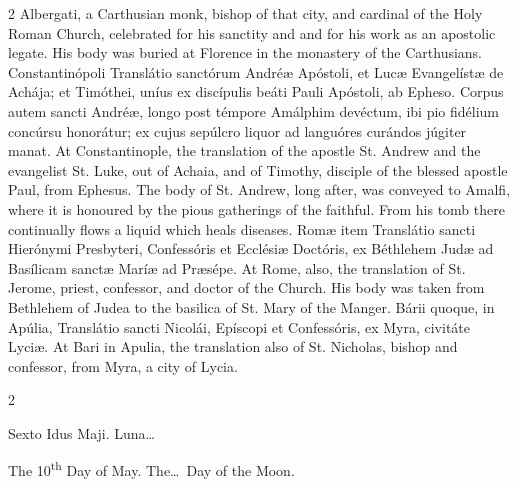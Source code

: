 \begin{paracol}{2}
 Albergati, a Carthusian monk, bishop of that city, and cardinal of the Holy 
 Roman Church, celebrated for his sanctity and and for his work as an 
 apostolic legate. His body was buried at Florence in the monastery of 
 the Carthusians.
\switchcolumn*
{}
Constantinópoli 
 Translátio sanctórum Andréæ Apóstoli, et Lucæ Evangelístæ de Achája; et 
 Timóthei, uníus ex discípulis beáti Pauli Apóstoli, ab Epheso. Corpus 
 autem sancti Andréæ, longo post témpore Amálphim devéctum, ibi pio fidélium 
 concúrsu honorátur; ex cujus sepúlcro liquor ad languóres curándos júgiter 
 manat.
\switchcolumn
{}
At Constantinople, the translation 
 of the apostle St. Andrew and the evangelist St. Luke, out of Achaia, and of 
 Timothy, disciple of the blessed apostle Paul, from Ephesus. The body 
 of St. Andrew, long after, was conveyed to Amalfi, where it is honoured by 
 the pious gatherings of the faithful. From his tomb there continually 
 flows a liquid which heals diseases.
\switchcolumn*
{}
Romæ item Translátio 
 sancti Hierónymi Presbyteri, Confessóris et Ecclésiæ Doctóris, ex Béthlehem Judæ ad Basílicam sanctæ Maríæ ad Præsépe.
\switchcolumn
{}
At Rome, also, the translation of 
 St. Jerome, priest, confessor, and doctor of the Church. His body was 
 taken from Bethlehem of Judea to the basilica of St. Mary of the Manger.
\switchcolumn*
{}
Bárii quoque, in 
 Apúlia, Translátio sancti Nicolái, Epíscopi et Confessóris, ex Myra, 
 civitáte Lyciæ.
\switchcolumn
{}
At Bari in Apulia, the translation 
 also of St. Nicholas, bishop and confessor, from Myra, a city of Lycia.
\switchcolumn*
{}
\end{paracol}


\begin{paracol}{2}
\begin{center}{\color{gregoriocolor} Sexto Idus Maji. 
 Luna\dots\ }\end{center}
\switchcolumn
{}
\begin{center}{\color{gregoriocolor} The 
 10\textsuperscript{th} Day of May. The\dots\ Day of the Moon.}\end{center}
\end{paracol}

